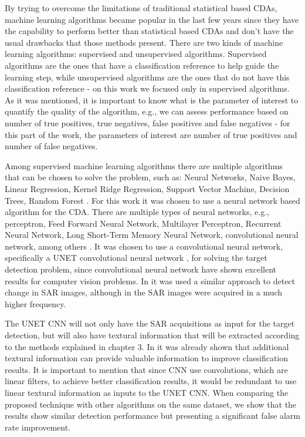 By trying to overcome the limitations of traditional statistical based CDAs, machine learning algorithms became popular in the last few years \cite{Vinholi, Campos} since they
have the capability to perform better than statistical based CDAs and don't have the usual drawbacks that those methods present. There are two kinds of machine learning algorithms: supervised and unsupervised
algorithms. Supervised algorithms are the ones that have a  classification reference to help guide the learning step, while unsupervised algorithms are the ones that do not have this classification reference - 
on this work we focused only in supervised algorithms. As it was mentioned, it is important to know what is the parameter of interest to quantify the quality of the algorithm, e.g., we can assess performance
based on number of true positives, true negatives, false positives and false negatives \cite{PefMe} - for this part of the work, the parameters of interest are number of true positives and number of false negatives.

Among supervised machine learning algorithms there are multiple algorithms that can be chosen to solve the problem, such as: Neural Networks, Naive Bayes, Linear Regression, Kernel Ridge Regression, Support Vector Machine, Decision Trees, Random Forest \cite{PefMe}.
For this work it was chosen to use a neural network based algorithm for the CDA. There are multiple types of neural networks, e.g., perceptron, Feed Forward Neural Network, Multilayer Perceptron, Recurrent Neural Network, Long Short-Term Memory Neural Network, convolutional
neural network, among others \cite{PefMe}. It was chosen to use a convolutional neural network, specifically a UNET convolutional neural network \cite{Unet}, for solving the target detection problem, since convolutional neural network have shown
excellent results for computer vision problems. In \cite{Kevin} it was used a similar approach to detect change in SAR images, although in \cite{Kevin} the SAR images were acquired in a much higher frequency. 
  
The UNET CNN will not only have the SAR acquisitions as input for the target detection, but will also have textural information that will be extracted according to the methods explained in 
chapter 3. 
In \cite{Rodrigo} it was already shown that additional textural information can provide valuable information to improve classification results. It is important to mention that since CNN use convolutions, which are linear filters, to achieve better classification results,
it would be redundant to use linear textural information as inputs to the UNET CNN.  When comparing the proposed technique with other algorithms on the same dataset, we show that the results show similar detection performance but presenting a significant false alarm rate improvement.

